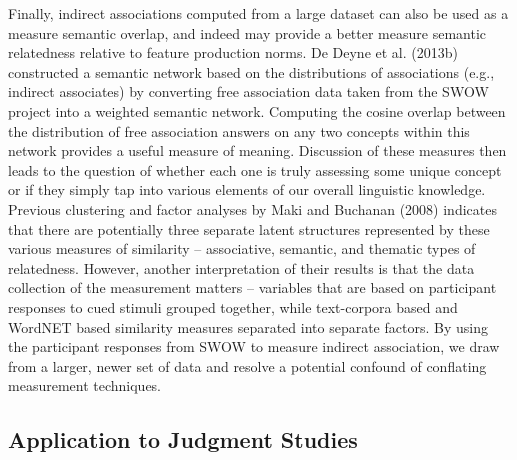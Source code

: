 \documentclass[english,,man]{apa6}
\begin{document}
Finally, indirect associations computed from a large dataset can also be used as a measure semantic overlap, and indeed may provide a better measure semantic relatedness relative to feature production norms. De Deyne et al. (2013b) constructed a semantic network based on the distributions of associations (e.g., indirect associates) by converting free association data taken from the SWOW project into a weighted semantic network. Computing the cosine overlap between the distribution of free association answers on any two concepts within this network provides a useful measure of meaning. Discussion of these measures then leads to the question of whether each one is truly assessing some unique concept or if they simply tap into various elements of our overall linguistic knowledge. Previous clustering and factor analyses by Maki and Buchanan (2008) indicates that there are potentially three separate latent structures represented by these various measures of similarity -- associative, semantic, and thematic types of relatedness. However, another interpretation of their results is that the data collection of the measurement matters -- variables that are based on participant responses to cued stimuli grouped together, while text-corpora based and WordNET based similarity measures separated into separate factors. By using the participant responses from SWOW to measure indirect association, we draw from a larger, newer set of data and resolve a potential confound of conflating measurement techniques.

\hypertarget{application-to-judgment-studies}{%
\subsection{Application to Judgment Studies}\label{application-to-judgment-studies}}
\end{document}
